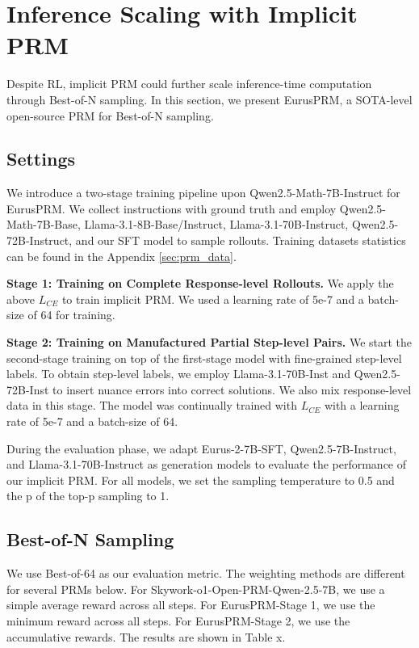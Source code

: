 \section{Inference Scaling with Implicit PRM}
Despite RL, implicit PRM could further scale inference-time computation through Best-of-N sampling. In this section, we present EurusPRM, a SOTA-level open-source PRM for Best-of-N sampling.

\subsection{Settings}
We introduce a two-stage training pipeline  upon Qwen2.5-Math-7B-Instruct for EurusPRM. We collect instructions with ground truth and employ Qwen2.5-Math-7B-Base, Llama-3.1-8B-Base/Instruct, Llama-3.1-70B-Instruct, Qwen2.5-72B-Instruct, and our SFT model to sample rollouts. Training datasets statistics can be found in the Appendix \ref{sec:prm_data}.

\textbf{Stage 1: Training on Complete Response-level Rollouts.} We apply the above $L_{CE}$ to train implicit PRM. We used a learning rate of  5e-7 and a batch-size of 64 for training. 

\textbf{Stage 2: Training on Manufactured Partial Step-level Pairs.} We start the second-stage training on top of the first-stage model with fine-grained step-level labels. To obtain step-level labels, we employ Llama-3.1-70B-Inst and Qwen2.5-72B-Inst to insert nuance errors into correct solutions. We also mix response-level data in this stage. The model was continually trained with $L_{CE}$ with a learning rate of 5e-7 and a batch-size of 64.

During the evaluation phase, we adapt Eurus-2-7B-SFT, Qwen2.5-7B-Instruct, and Llama-3.1-70B-Instruct as generation models to evaluate the performance of our implicit PRM. For all models, we set the sampling temperature to 0.5 and the p of the top-p sampling to 1.

\subsection{Best-of-N Sampling}
We use Best-of-64 as our evaluation metric. The weighting methods are different for several PRMs below. For Skywork-o1-Open-PRM-Qwen-2.5-7B, we use a simple average reward across all steps. For EurusPRM-Stage 1, we use the minimum reward across all steps. For EurusPRM-Stage 2, we use the accumulative rewards. The results are shown in Table x.